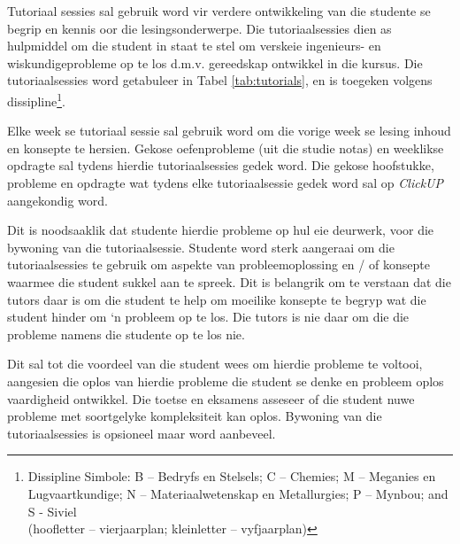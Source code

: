         Tutoriaal sessies sal gebruik word vir verdere ontwikkeling van die
        studente se begrip en kennis oor die lesingsonderwerpe.  Die
        tutoriaalsessies dien as hulpmiddel om die student in staat te stel om
        verskeie ingenieurs- en wiskundigeprobleme op te los d.m.v. gereedskap
        ontwikkel in die kursus. Die tutoriaalsessies word getabuleer in Tabel
        \ref{tab:tutorials}, en is toegeken volgens
        dissipline\footnote{Dissipline Simbole:
            B -- Bedryfs en Stelsels;
            C -- Chemies;
            M -- Meganies en Lugvaartkundige;
            N -- Materiaalwetenskap en Metallurgies;
            P -- Mynbou; and S - Siviel \\
            (hoofletter -- vierjaarplan; kleinletter -- vyfjaarplan)}.

        Elke week se tutoriaal sessie sal gebruik word om die vorige week se
        lesing inhoud en konsepte te hersien. Gekose oefenprobleme (uit die
        studie notas) en weeklikse opdragte sal tydens hierdie tutoriaalsessies
        gedek word. Die gekose hoofstukke, probleme en opdragte wat tydens elke
        tutoriaalsessie gedek word sal op {\it ClickUP} aangekondig word.

        Dit is noodsaaklik dat studente hierdie probleme op hul eie deurwerk,
        voor die bywoning van die tutoriaalsessie. Studente word sterk
        aangeraai om die tutoriaalsessies te gebruik om aspekte van
        probleemoplossing en / of konsepte waarmee die student sukkel aan te
        spreek. Dit is belangrik om te verstaan dat die tutors daar is om die
        student te help om moeilike konsepte te begryp wat die student hinder
        om `n probleem op te los. Die tutors is nie daar om die die probleme
        namens die studente op te los nie.

        Dit sal tot die voordeel van die student wees om hierdie probleme te
        voltooi, aangesien die oplos van hierdie probleme die student se denke
        en probleem oplos vaardigheid ontwikkel.  Die toetse en eksamens
        asseseer of die student nuwe probleme met soortgelyke kompleksiteit kan
        oplos. Bywoning van die tutoriaalsessies is opsioneel maar word
        aanbeveel.
